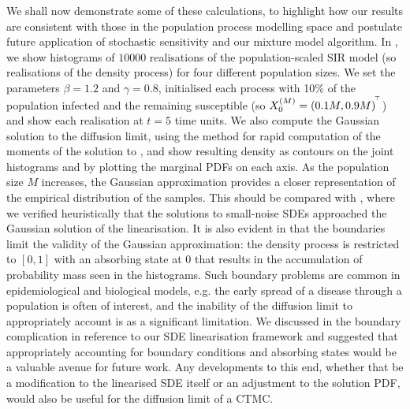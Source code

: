 We shall now demonstrate some of these calculations, to highlight how our results are consistent with those in the population process modelling space and postulate future application of stochastic sensitivity and our mixture model algorithm.
In , we show histograms of \(10000\) realisations of the population-scaled SIR model (so realisations of the density process) for four different population sizes.
We set the parameters \(\beta = 1.2\) and \(\gamma = 0.8\), initialised each process with 10\% of the population infected and the remaining susceptible (so \(X_0^{(M)} = \left(0.1M, 0.9M\right)^{^{\!\top}}\)) and show each realisation at \(t = 5\) time units.
We also compute the Gaussian solution to the diffusion limit, using the \citet{Mazzoni_2008_ComputationalAspectsContinuous} method for rapid computation of the moments of the solution to , and show resulting density as contours on the joint histograms and by plotting the marginal PDFs on each axis.
As the population size \(M\) increases, the Gaussian approximation provides a closer representation of the empirical distribution of the samples.
This should be compared with , where we verified heuristically that the solutions to small-noise SDEs approached the Gaussian solution of the linearisation.
It is also evident in  that the boundaries limit the validity of the Gaussian approximation: the density process is restricted to \([0, 1]\) with an absorbing state at \(0\) that results in the accumulation of probability mass seen in the histograms.
Such boundary problems are common in epidemiological and biological models, e.g. the early spread of a disease through a population is often of interest, and the inability of the diffusion limit to appropriately account is as a significant limitation.
We discussed in  the boundary complication in reference to our SDE linearisation framework and suggested that appropriately accounting for boundary conditions and absorbing states would be a valuable avenue for future work.
Any developments to this end, whether that be a modification to the linearised SDE itself or an adjustment to the solution PDF, would also be useful for the diffusion limit of a CTMC.


